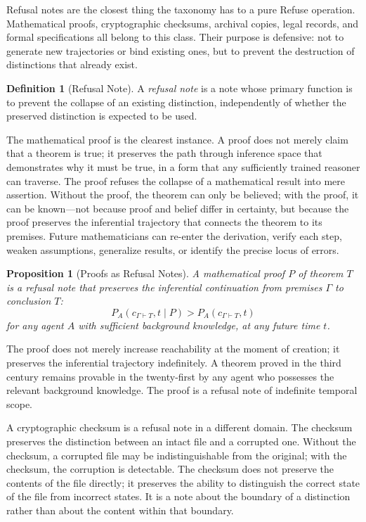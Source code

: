 \documentclass[12pt, a4paper]{article}
\theoremstyle{plain}
\newtheorem{proposition}[theorem]{Proposition}
\theoremstyle{definition}
\newtheorem{definition}[theorem]{Definition}
\theoremstyle{remark}
\begin{document}
Refusal notes are the closest thing the taxonomy has to a pure Refuse operation.
Mathematical proofs, cryptographic checksums, archival copies, legal records, and
formal specifications all belong to this class. Their purpose is defensive: not to
generate new trajectories or bind existing ones, but to prevent the destruction of
distinctions that already exist.

\begin{definition}[Refusal Note]
A \emph{refusal note} is a note whose primary function is to prevent the collapse
of an existing distinction, independently of whether the preserved distinction is
expected to be used.
\end{definition}

The mathematical proof is the clearest instance. A proof does not merely claim that
a theorem is true; it preserves the path through inference space that demonstrates
why it must be true, in a form that any sufficiently trained reasoner can traverse.
The proof refuses the collapse of a mathematical result into mere assertion. Without
the proof, the theorem can only be believed; with the proof, it can be known---not
because proof and belief differ in certainty, but because the proof preserves the
inferential trajectory that connects the theorem to its premises. Future
mathematicians can re-enter the derivation, verify each step, weaken assumptions,
generalize results, or identify the precise locus of errors.

\begin{proposition}[Proofs as Refusal Notes]
A mathematical proof $P$ of theorem $T$ is a refusal note that preserves the
inferential continuation from premises $\Gamma$ to conclusion $T$:
\[
P_A(c_{\Gamma \vdash T}, t \mid P) > P_A(c_{\Gamma \vdash T}, t)
\]
for any agent $A$ with sufficient background knowledge, at any future time $t$.
\end{proposition}

The proof does not merely increase reachability at the moment of creation; it
preserves the inferential trajectory indefinitely. A theorem proved in the third
century remains provable in the twenty-first by any agent who possesses the
relevant background knowledge. The proof is a refusal note of indefinite
temporal scope.

A cryptographic checksum is a refusal note in a different domain. The checksum
preserves the distinction between an intact file and a corrupted one. Without the
checksum, a corrupted file may be indistinguishable from the original; with the
checksum, the corruption is detectable. The checksum does not preserve the contents
of the file directly; it preserves the ability to distinguish the correct state of
the file from incorrect states. It is a note about the boundary of a distinction
rather than about the content within that boundary.
\end{document}
